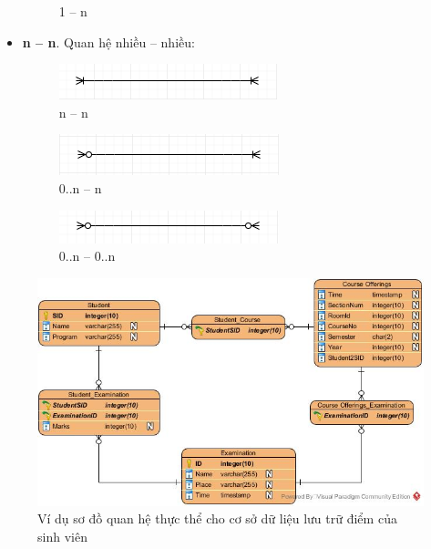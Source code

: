 \documentclass{article}
\begin{document}
\begin{itemize}
\begin{figure}[!ht]
      \caption{1 -- n}
    \end{figure}
    \item \textbf{n -- n}. Quan hệ nhiều -- nhiều:
    \begin{figure}[!ht]
      \centering
      \includegraphics[scale=0.8]{../pictures/diagrams/entityrelationship/Many-mandatory-to-Many-mandatory.PNG}
      \caption{n -- n}
    \end{figure}
    \begin{figure}[!ht]
      \centering
      \includegraphics[scale=0.8]{../pictures/diagrams/entityrelationship/Many-optional-to-Many-mandatory.PNG}
      \caption{0..n -- n}
    \end{figure}
    \begin{figure}[!ht]
      \centering
      \includegraphics[scale=0.8]{../pictures/diagrams/entityrelationship/Many-optional-to-Many-optional.PNG}
      \caption{0..n -- 0..n}
    \end{figure}
  \end{itemize}

  \begin{figure}[!ht]
    \centering
    \includegraphics[scale=0.5]{../pictures/diagrams/entityrelationship/entity-relationship-diagram-1.jpg}
    \caption{Ví dụ sơ đồ quan hệ thực thể cho cơ sở dữ liệu lưu trữ điểm của sinh viên}
  \end{figure}
\end{document}
